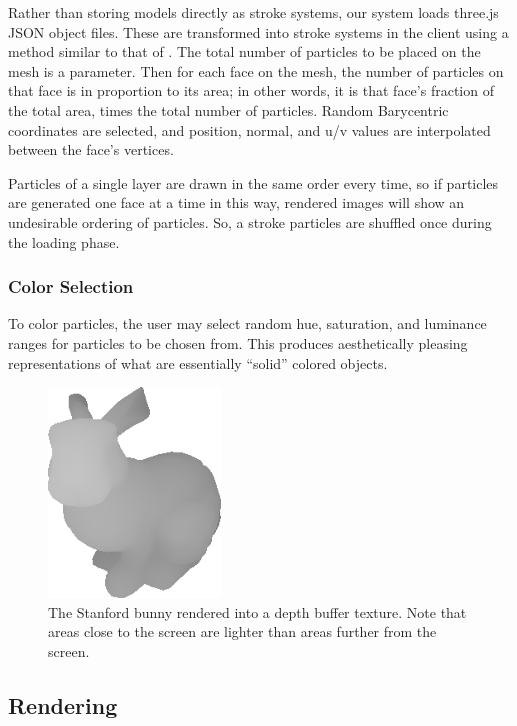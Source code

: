 \documentclass[conference]{acmsiggraph}
\begin{document}
Rather than storing models directly as stroke systems, our system loads
three.js JSON object files. These are transformed into stroke systems in the
client using a method similar to that of \cite{Meier:1996:PRA:237170.237288}.
The total number of particles to be placed on the mesh is a parameter. Then for
each face on the mesh, the number of particles on that face is in proportion to
its area; in other words, it is that face's fraction of the total area, times
the total number of particles. Random Barycentric coordinates are selected, and
position, normal, and u/v values are interpolated between the face's vertices.

Particles of a single layer are drawn in the same order every time, so if
particles are generated one face at a time in this way, rendered images will
show an undesirable ordering of particles. So, a stroke particles are shuffled
once during the loading phase.


\subsubsection{Color Selection}

To color particles, the user may select random hue, saturation, and luminance
ranges for particles to be chosen from. This produces aesthetically pleasing
representations of what are essentially ``solid'' colored objects.

\begin{figure}[b]
  \centering
  \includegraphics[width=1.8in]{images/better_depth_value_rendering_cropped}
  \caption{The Stanford bunny rendered into a depth buffer texture. Note that
           areas close to the screen are lighter than areas further from the
           screen.}
\end{figure}


\subsection{Rendering}
\end{document}
